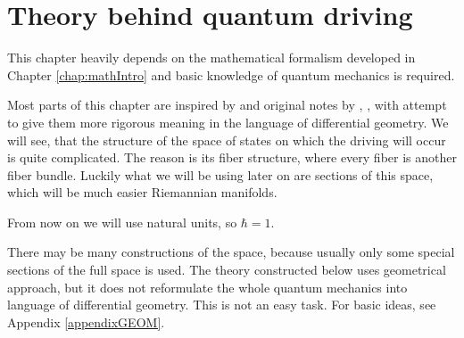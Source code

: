 \chapter{Theory behind quantum driving}
\label{chap:driving}
This chapter heavily depends on the mathematical formalism developed in Chapter \ref{chap:mathIntro} and basic knowledge of quantum mechanics is required.

Most parts of this chapter are inspired by \citet{kolodrubez} and original notes by \citet{berry1984}, \citet{berry1989}, \citet{berry2009} with attempt to give them more rigorous meaning in the language of differential geometry. We will see, that the structure of the space of states on which the driving will occur is quite complicated. The reason is its fiber structure, where every fiber is another fiber bundle. Luckily what we will be using later on are sections of this space, which will be much easier Riemannian manifolds. 

From now on we will use natural units, so $\hbar=1$.

There may be many constructions of the space, because usually only some special sections of the full space is used. The theory constructed below uses geometrical approach, but it does not reformulate the whole quantum mechanics into language of differential geometry. This is not an easy task. For basic ideas, see Appendix \ref{appendixGEOM}.


